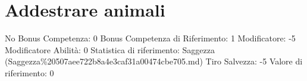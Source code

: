 \section{Addestrare animali}\label{addestrare-animali}

\begin{description}
\tightlist
\item[Tags: ABI]
No Bonus Competenza: 0 Bonus Competenza di Riferimento: 1 Modificatore:
-5 Modificatore Abilità: 0 Statistica di riferimento: Saggezza
(Saggezza\%20507aee722b8a4e3caf31a00474cbe705.md) Tiro Salvezza: -5
Valore di riferimento: 0
\end{description}
